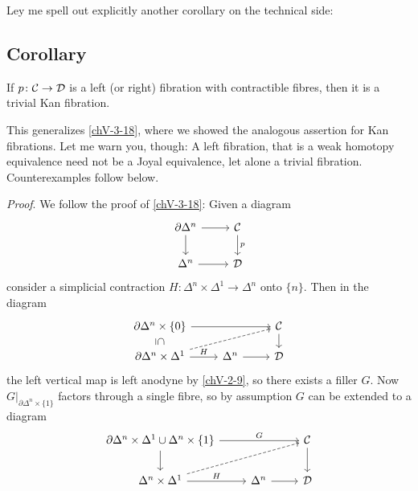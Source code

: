         Ley me spell out explicitly another corollary on the technical side:

    \subsection{Corollary}\label{chVI-3-29}
        If $p \colon \mathcal{C} \to \mathcal{D}$ is a left (or right) fibration with contractible fibres, then it is a trivial Kan fibration.
        \medskip

        This generalizes \ref{chV-3-18}, where we showed the analogous assertion for Kan fibrations. Let me warn you, though: A left fibration, that is a weak homotopy equivalence need not be a Joyal equivalence, let alone a trivial fibration. Counterexamples follow below.
        \smallskip

        \emph{Proof}. We follow the proof of \ref{chV-3-18}: Given a diagram
        \begin{equation*}
            \begin{tikzcd}
                \partial \Delta^n \arrow[d] \arrow[r] & \Cc \arrow[d, "p"] \\
                \Delta^n \arrow[r] & \Dd
            \end{tikzcd}
        \end{equation*}
        consider a simplicial contraction $H \colon \Delta^n \times \Delta^1 \to \Delta^n$ onto $\{n\}$. Then in the diagram
        \begin{equation*}
            \begin{tikzcd}[row sep=small]
                \partial \Delta^n \times \{0\} \arrow[d, phantom, "\subseteq" rotate=-90] \arrow[rr] & & \Cc \arrow[d] \\
                \partial \Delta^n \times \Delta^1 \arrow[urr, dashed] \arrow[r, "H"] & \Delta^n \arrow[r] & \Dd
            \end{tikzcd}
        \end{equation*}
        the left vertical map is left anodyne by \ref{chV-2-9}, so there exists a filler $G$. Now ${G|}_{\partial \Delta^n \times \{1\}}$ factors through a single fibre, so by assumption $G$ can be extended to a diagram
        \begin{equation*}
            \begin{tikzcd}
                \partial \Delta^n \times \Delta^1 \cup \Delta^n \times \{1\} \arrow[d] \arrow[rr, "G"] & & \Cc \arrow[d] \\
                \Delta^n \times \Delta^1 \arrow[urr, dashed] \arrow[r, "H"] & \Delta^n \arrow[r] & \Dd
            \end{tikzcd}
        \end{equation*}
